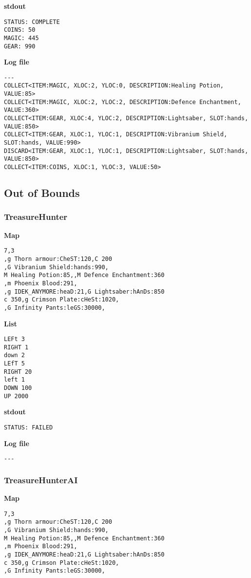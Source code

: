 \documentclass{article}
\begin{document}
\textbf{stdout}
\begin{lstlisting}
STATUS: COMPLETE
COINS: 50
MAGIC: 445
GEAR: 990
\end{lstlisting}

\textbf{Log file}
\begin{lstlisting}
---
COLLECT<ITEM:MAGIC, XLOC:2, YLOC:0, DESCRIPTION:Healing Potion, VALUE:85>
COLLECT<ITEM:MAGIC, XLOC:2, YLOC:2, DESCRIPTION:Defence Enchantment, VALUE:360>
COLLECT<ITEM:GEAR, XLOC:4, YLOC:2, DESCRIPTION:Lightsaber, SLOT:hands, VALUE:850>
COLLECT<ITEM:GEAR, XLOC:1, YLOC:1, DESCRIPTION:Vibranium Shield, SLOT:hands, VALUE:990>
DISCARD<ITEM:GEAR, XLOC:1, YLOC:1, DESCRIPTION:Lightsaber, SLOT:hands, VALUE:850>
COLLECT<ITEM:COINS, XLOC:1, YLOC:3, VALUE:50>
\end{lstlisting}

\subsection{Out of Bounds}
\subsubsection{TreasureHunter}
\quad \textbf{Map}
\begin{lstlisting}
7,3
,g Thorn armour:CheST:120,C 200
,G Vibranium Shield:hands:990,
M Healing Potion:85,,M Defence Enchantment:360
,m Phoenix Blood:291,
,g IDEK_ANYMORE:heaD:21,G Lightsaber:hAnDs:850
c 350,g Crimson Plate:cHeSt:1020,
,G Infinity Pants:leGS:30000,
\end{lstlisting}

\textbf{List}
\begin{lstlisting}
LEFt 3
RIGHT 1
down 2
LEfT 5
RIGHT 20
left 1
DOWN 100
UP 2000
\end{lstlisting}
\pagebreak

\textbf{stdout}
\begin{lstlisting}
STATUS: FAILED
\end{lstlisting}

\textbf{Log file}
\begin{lstlisting}
---
\end{lstlisting}

\subsubsection{TreasureHunterAI}
\quad \textbf{Map}
\begin{lstlisting}
7,3
,g Thorn armour:CheST:120,C 200
,G Vibranium Shield:hands:990,
M Healing Potion:85,,M Defence Enchantment:360
,m Phoenix Blood:291,
,g IDEK_ANYMORE:heaD:21,G Lightsaber:hAnDs:850
c 350,g Crimson Plate:cHeSt:1020,
,G Infinity Pants:leGS:30000,
\end{lstlisting}
\end{document}
